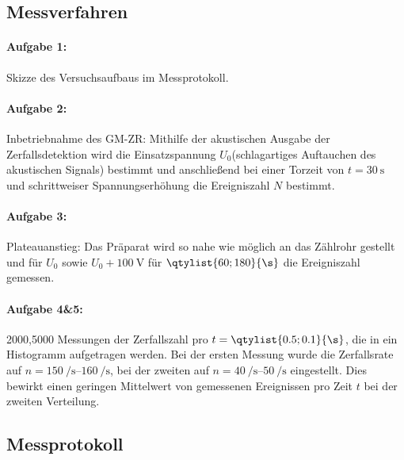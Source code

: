 \subsection{Messverfahren}
\paragraph{Aufgabe 1:} Skizze des Versuchsaufbaus im Messprotokoll.

\paragraph{Aufgabe 2:} Inbetriebnahme des GM-ZR: Mithilfe der akustischen Ausgabe der Zerfallsdetektion wird die Einsatzspannung \(U_0\)(schlagartiges Auftauchen des akustischen Signals) bestimmt und anschließend bei einer Torzeit von \(t=\qty{30}{\s}\) und schrittweiser Spannungserhöhung die Ereigniszahl \(N\) bestimmt. 

\paragraph{Aufgabe 3:} Plateauanstieg: Das Präparat wird so nahe wie möglich an das Zählrohr gestellt und für \(U_0\) sowie \(U_0+\qty{100}{\volt}\) für \(\qtylist{60;180}{\s}\) die Ereigniszahl gemessen. 

\paragraph{Aufgabe 4\&5:} 2000,5000 Messungen der Zerfallszahl pro \(t=\qtylist{0.5;0.1}{\s}\), die in ein Histogramm aufgetragen werden. Bei der ersten Messung wurde die Zerfallsrate auf \(n=\qtyrange{150}{160}{\per\s}\), bei der zweiten auf \(n=\qtyrange{40}{50}{\per\s}\) eingestellt. Dies bewirkt einen geringen Mittelwert von gemessenen Ereignissen pro Zeit \(t\) bei der zweiten Verteilung. 
\vfill
\subsection{Messprotokoll}

